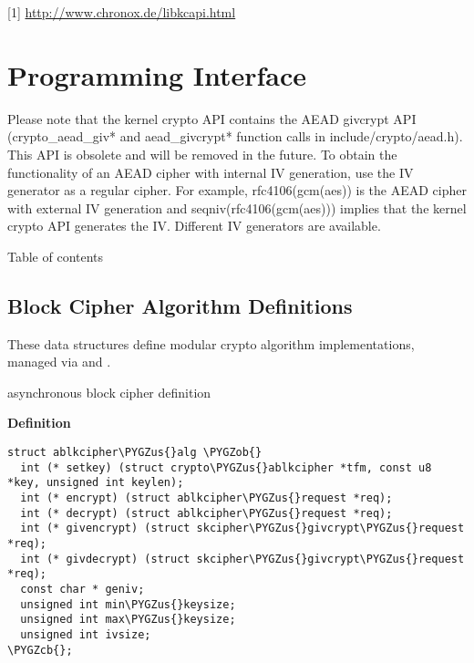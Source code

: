 \documentclass[a4paper,8pt,english]{sphinxmanual}
\def\PYGZus{\char`\_}
\def\PYGZob{\char`\{}
\def\PYGZcb{\char`\}}
\begin{document}
{[}1{]} \url{http://www.chronox.de/libkcapi.html}


\chapter{Programming Interface}
\label{crypto/api:programming-interface}\label{crypto/api::doc}
Please note that the kernel crypto API contains the AEAD givcrypt API
(crypto\_aead\_giv* and aead\_givcrypt* function calls in
include/crypto/aead.h). This API is obsolete and will be removed in the
future. To obtain the functionality of an AEAD cipher with internal IV
generation, use the IV generator as a regular cipher. For example,
rfc4106(gcm(aes)) is the AEAD cipher with external IV generation and
seqniv(rfc4106(gcm(aes))) implies that the kernel crypto API generates
the IV. Different IV generators are available.

Table of contents


\section{Block Cipher Algorithm Definitions}
\label{crypto/api-skcipher:block-cipher-algorithm-definitions}\label{crypto/api-skcipher::doc}
These data structures define modular crypto algorithm implementations,
managed via  and .

\begin{fulllineitems}
\label{crypto/api-skcipher:c.ablkcipher_alg}
asynchronous block cipher definition

\end{fulllineitems}


\textbf{Definition}

\begin{Verbatim}[commandchars=\\\{\}]
struct ablkcipher\PYGZus{}alg \PYGZob{}
  int (* setkey) (struct crypto\PYGZus{}ablkcipher *tfm, const u8 *key, unsigned int keylen);
  int (* encrypt) (struct ablkcipher\PYGZus{}request *req);
  int (* decrypt) (struct ablkcipher\PYGZus{}request *req);
  int (* givencrypt) (struct skcipher\PYGZus{}givcrypt\PYGZus{}request *req);
  int (* givdecrypt) (struct skcipher\PYGZus{}givcrypt\PYGZus{}request *req);
  const char * geniv;
  unsigned int min\PYGZus{}keysize;
  unsigned int max\PYGZus{}keysize;
  unsigned int ivsize;
\PYGZcb{};
\end{Verbatim}
\end{document}
